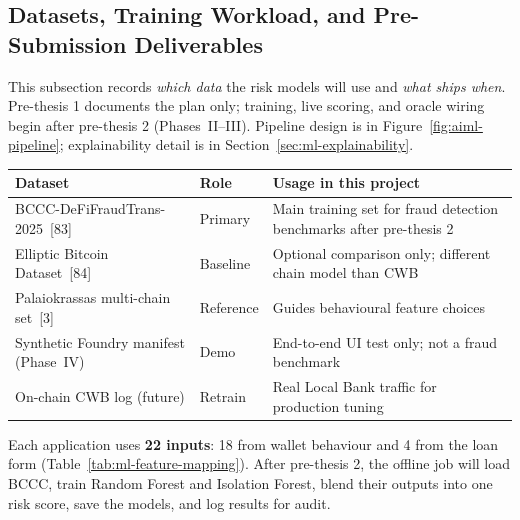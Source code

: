 \documentclass[12pt, a4paper]{report}
\newcommand{\tableheadcolor}{\rowcolor{TableHeadBg}}
\begin{document}
\subsection{Datasets, Training Workload, and Pre-Submission Deliverables}
\label{sec:ml-workload}

This subsection records \textit{which data} the risk models will use and \textit{what ships when}. Pre-thesis 1 documents the plan only; training, live scoring, and oracle wiring begin after pre-thesis 2 (Phases~II--III). Pipeline design is in Figure~\ref{fig:aiml-pipeline}; explainability detail is in Section~\ref{sec:ml-explainability}.

\begin{table}[H]
\centering
\label{tab:ml-datasets}
\begin{tabular}{p{3.4cm}p{2.2cm}p{7.6cm}}
\toprule
\tableheadcolor
\textbf{Dataset} & \textbf{Role} & \textbf{Usage in this project} \\
\midrule
BCCC-DeFiFraudTrans-2025~[83] & Primary & Main training set for fraud detection benchmarks after pre-thesis 2 \\
Elliptic Bitcoin Dataset~[84] & Baseline & Optional comparison only; different chain model than CWB \\
Palaiokrassas multi-chain set~[3] & Reference & Guides behavioural feature choices \\
Synthetic Foundry manifest (Phase~IV) & Demo & End-to-end UI test only; not a fraud benchmark \\
On-chain CWB log (future) & Retrain & Real Local Bank traffic for production tuning \\
\bottomrule
\end{tabular}
\end{table}

Each application uses \textbf{22 inputs}: 18 from wallet behaviour and 4 from the loan form (Table~\ref{tab:ml-feature-mapping}). After pre-thesis 2, the offline job will load BCCC, train Random Forest and Isolation Forest, blend their outputs into one risk score, save the models, and log results for audit.
\end{document}
